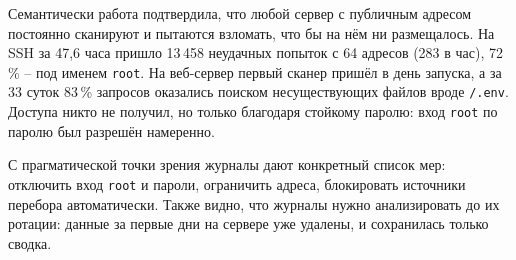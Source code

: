 \newpage
{}

Семантически работа подтвердила, что любой сервер с публичным адресом
постоянно сканируют и пытаются взломать, что бы на нём ни размещалось. На
SSH за 47,6 часа пришло 13\,458 неудачных попыток с 64 адресов (283 в час),
72\,\% -- под именем \texttt{root}. На веб-сервер первый сканер пришёл в
день запуска, а за 33 суток 83\,\% запросов оказались поиском
несуществующих файлов вроде \texttt{/.env}. Доступа никто не получил, но
только благодаря стойкому паролю: вход \texttt{root} по паролю был
разрешён намеренно.

С прагматической точки зрения журналы дают конкретный список мер:
отключить вход \texttt{root} и пароли, ограничить адреса, блокировать
источники перебора автоматически. Также видно, что журналы нужно
анализировать до их ротации: данные за первые дни на сервере уже
удалены, и сохранилась только сводка.
